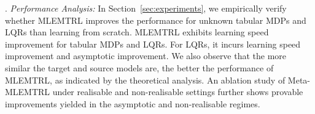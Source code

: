 . \textit{Performance Analysis:} In Section~\ref{sec:experiments}, we empirically verify whether MLEMTRL improves the performance for unknown tabular MDPs and LQRs than learning from scratch. MLEMTRL exhibits learning speed improvement for tabular MDPs and LQRs. For LQRs, it incurs learning speed improvement and asymptotic improvement. We also observe that the more similar the target and source models are, the better the performance of MLEMTRL, as indicated by the theoretical analysis. An ablation study of Meta-MLEMTRL under realisable and non-realisable settings further shows provable improvements yielded in the asymptotic and non-realisable regimes.%



